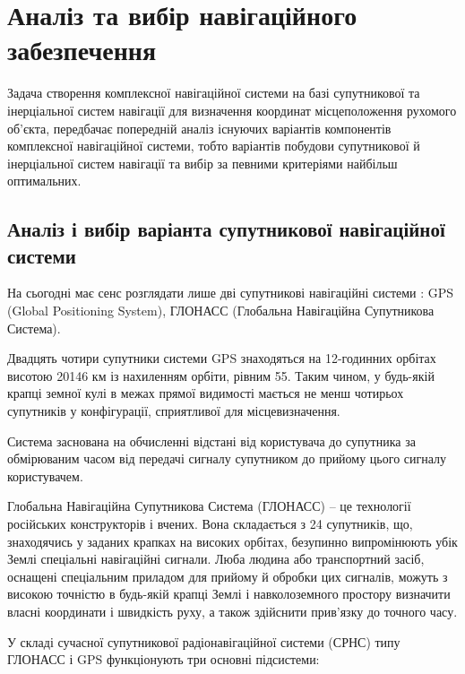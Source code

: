 \section{Аналіз та вибір навігаційного забезпечення}

Задача створення комплексної навігаційної системи на базі супутникової та інерціальної 
систем навігації для визначення координат місцеположення рухомого об'єкта, передбачає 
попередній аналіз існуючих варіантів компонентів комплексної навігаційної системи, тобто 
варіантів побудови супутникової й  інерціальної систем навігації та вибір за певними критеріями найбільш оптимальних. 


\subsection{Аналіз і вибір варіанта супутникової навігаційної системи }

На сьогодні має сенс розглядати лише дві супутникові навігаційні системи : GPS (Global Positioning System), 
ГЛОНАСС (Глобальна Навігаційна Супутникова Система).

Двадцять чотири супутники системи GPS знаходяться на 12-годинних орбітах висотою 
20146 км із нахиленням орбіти, рівним 55. Таким чином, 
у будь-якій крапці земної кулі в межах прямої видимості мається не менш чотирьох супутників 
у конфігурації, сприятливої для місцевизначення.

Система заснована на обчисленні відстані від користувача до супутника за обмірюваним часом 
від передачі сигналу супутником до прийому цього сигналу користувачем.

Глобальна Навігаційна Супутникова Система (ГЛОНАСС) -- це технології російських конструкторів і вчених.
Вона складається 
з 24 супутників, що, знаходячись у заданих крапках на високих орбітах, безупинно випромінюють 
убік Землі спеціальні навігаційні сигнали. Люба людина або транспортний засіб, оснащені 
спеціальним приладом для прийому й обробки цих сигналів, можуть з високою точністю в 
будь-якій крапці Землі і навколоземного простору визначити власні координати і швидкість 
руху, а також здійснити прив'язку до точного часу.

У складі сучасної супутникової радіонавігаційної системи (СРНС) типу ГЛОНАСС і 
GPS функціонують три основні підсистеми:

